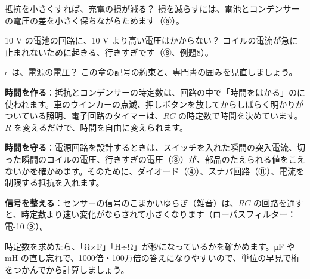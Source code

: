 \begin{tsumazuki}{抵抗を小さくすれば、充電の損が減る？}
損を減らすには、電池とコンデンサーの電圧の差を小さく保ちながらためます（⑥）。
\end{tsumazuki}

\begin{tsumazuki}{10 V の電池の回路に、10 V より高い電圧はかからない？}
コイルの電流が急に止まれないために起きる、行きすぎです（⑧、例題8）。
\end{tsumazuki}

\begin{tsumazuki}{$e$ は、電源の電圧？}
この章の記号の約束と、専門書の囲みを見直しましょう。
\end{tsumazuki}

\begin{phkougaku}
\textbf{時間を作る}：抵抗とコンデンサーの時定数は、回路の中で「時間をはかる」のに使われます。車のウインカーの点滅、押しボタンを放してからしばらく明かりがついている照明、電子回路のタイマーは、$RC$ の時定数で時間を決めています。$R$ を変えるだけで、時間を自由に変えられます。

\textbf{時間を守る}：電源回路を設計するときは、スイッチを入れた瞬間の突入電流、切った瞬間のコイルの電圧、行きすぎの電圧（⑧）が、部品のたえられる値をこえないかを確かめます。そのために、ダイオード（④）、スナバ回路（⑪）、電流を制限する抵抗を入れます。

\textbf{信号を整える}：センサーの信号のこまかいゆらぎ（雑音）は、$RC$ の回路を通すと、時定数より速い変化がならされて小さくなります（ローパスフィルター：電-10 ⑨）。

\begin{phketa}[時定数の目安]
時定数を求めたら、「Ω×F」「H÷Ω」が秒になっているかを確かめます。\si{\micro F} や mH の直し忘れで、1000倍・100万倍の答えになりやすいので、単位の早見で桁をつかんでから計算しましょう。
\end{phketa}
\end{phkougaku}

